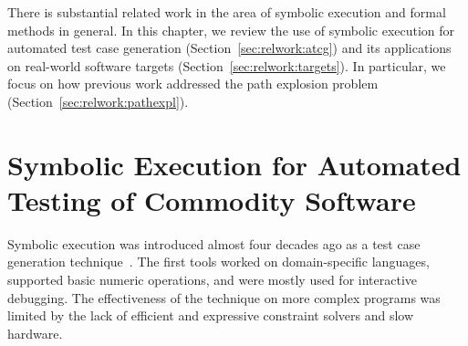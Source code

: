 There is substantial related work in the area of symbolic execution and formal methods in general.  In this chapter, we review the use of symbolic execution for automated test case generation (Section~\ref{sec:relwork:atcg}) and its applications on real-world software targets (Section~\ref{sec:relwork:targets}).  In particular, we focus on how previous work addressed the path explosion problem (Section~\ref{sec:relwork:pathexpl}).


\section{Symbolic Execution for Automated Testing of Commodity Software}



Symbolic execution was introduced almost four decades ago as a test case generation technique~\cite{king:symbolic:2, boyer:symbolic}.  The first tools worked on domain-specific languages, supported basic numeric operations, and were mostly used for interactive debugging.  The effectiveness of the technique on more complex programs was limited by the lack of efficient and expressive constraint solvers and slow hardware.


